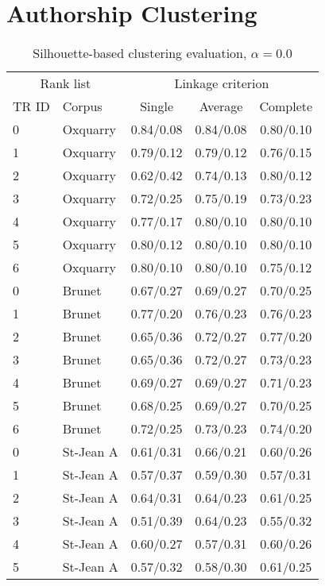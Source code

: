 \section{Authorship Clustering}

\begin{table}[H]
  \centering
  \caption{Silhouette-based clustering evaluation, $\alpha = 0.0$}
  \label{tab:silhouette-based_clustering_full}

  \begin{tabular}{l l c c c}
    \toprule
    \multicolumn{2}{c}{Rank list} & \multicolumn{3}{c}{Linkage criterion} \\
    TR ID & Corpus & Single & Average & Complete \\
    \midrule
    0 & Oxquarry & 0.84/0.08 & 0.84/0.08 & 0.80/0.10 \\
    1 & Oxquarry & 0.79/0.12 & 0.79/0.12 & 0.76/0.15 \\
    2 & Oxquarry & 0.62/0.42 & 0.74/0.13 & 0.80/0.12 \\
    3 & Oxquarry & 0.72/0.25 & 0.75/0.19 & 0.73/0.23 \\
    4 & Oxquarry & 0.77/0.17 & 0.80/0.10 & 0.80/0.10 \\
    5 & Oxquarry & 0.80/0.12 & 0.80/0.10 & 0.80/0.10 \\
    6 & Oxquarry & 0.80/0.10 & 0.80/0.10 & 0.75/0.12 \\
    0 & Brunet & 0.67/0.27 & 0.69/0.27 & 0.70/0.25 \\
    1 & Brunet & 0.77/0.20 & 0.76/0.23 & 0.76/0.23 \\
    2 & Brunet & 0.65/0.36 & 0.72/0.27 & 0.77/0.20 \\
    3 & Brunet & 0.65/0.36 & 0.72/0.27 & 0.73/0.23 \\
    4 & Brunet & 0.69/0.27 & 0.69/0.27 & 0.71/0.23 \\
    5 & Brunet & 0.68/0.25 & 0.69/0.27 & 0.70/0.25 \\
    6 & Brunet & 0.72/0.25 & 0.73/0.23 & 0.74/0.20 \\
    0 & St-Jean A & 0.61/0.31 & 0.66/0.21 & 0.60/0.26 \\
    1 & St-Jean A & 0.57/0.37 & 0.59/0.30 & 0.57/0.31 \\
    2 & St-Jean A & 0.64/0.31 & 0.64/0.23 & 0.61/0.25 \\
    3 & St-Jean A & 0.51/0.39 & 0.64/0.23 & 0.55/0.32 \\
    4 & St-Jean A & 0.60/0.27 & 0.57/0.31 & 0.60/0.26 \\
    5 & St-Jean A & 0.57/0.32 & 0.58/0.30 & 0.61/0.25 \\

\end{tabular}
\end{table}
